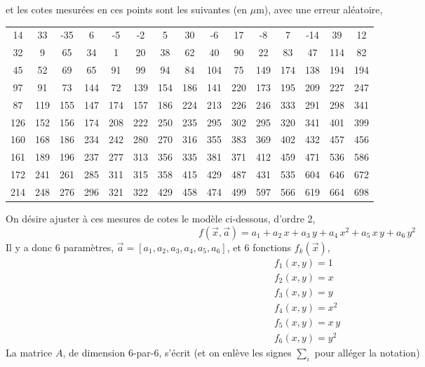 \documentclass[main.tex]{subfiles}
\begin{document}
et les cotes mesurées en ces points sont les suivantes (en $\mu$m), avec une erreur aléatoire,
\begin{center}
    \begin{tabular}{ccccccccccccccc}
        14  & 33  & -35 & 6   & -5  & -2  & 5   & 30  & -6  & 17  & -8  & 7   & -14 & 39  & 12  \\
        32  & 9   & 65  & 34  & 1   & 20  & 38  & 62  & 40  & 90  & 22  & 83  & 47  & 114 & 82  \\
        45  & 52  & 69  & 65  & 91  & 99  & 94  & 84  & 104 & 75  & 149 & 174 & 138 & 194 & 194 \\
        97  & 91  & 73  & 144 & 72  & 139 & 154 & 186 & 141 & 220 & 173 & 195 & 209 & 227 & 247 \\
        87  & 119 & 155 & 147 & 174 & 157 & 186 & 224 & 213 & 226 & 246 & 333 & 291 & 298 & 341 \\
        126 & 152 & 156 & 174 & 208 & 222 & 250 & 235 & 295 & 302 & 295 & 320 & 341 & 401 & 399 \\
        160 & 168 & 186 & 234 & 242 & 280 & 270 & 316 & 355 & 383 & 369 & 402 & 432 & 457 & 456 \\
        161 & 189 & 196 & 237 & 277 & 313 & 356 & 335 & 381 & 371 & 412 & 459 & 471 & 536 & 586 \\
        172 & 241 & 261 & 285 & 311 & 315 & 358 & 415 & 429 & 487 & 431 & 535 & 604 & 646 & 672 \\
        214 & 248 & 276 & 296 & 321 & 322 & 429 & 458 & 474 & 499 & 597 & 566 & 619 & 664 & 698
    \end{tabular}
\end{center}
On désire ajuster à ces mesures de cotes le modèle ci-dessous, d'ordre 2,
\begin{equation}
    f(\vec{x},\vec{a})=a_1+a_2\,x+a_3\,y+a_4\,x^2+a_5\,x\,y+a_6\,y^2
\end{equation}
Il y a donc 6 paramètres, $\vec{a}=[a_1,a_2,a_3,a_4,a_5,a_6]$, et 6 fonctions $f_k(\vec{x})$,
\begin{gather}
    f_1(x,y)=1\\
    f_2(x,y)=x\\
    f_3(x,y)=y\\
    f_4(x,y)=x^2\\
    f_5(x,y)=x\,y\\
    f_6(x,y)=y^2
\end{gather}
La matrice $A$, de dimension 6-par-6, s'écrit (et on enlève les signes $\sum_i$ pour alléger la notation)
\end{document}

